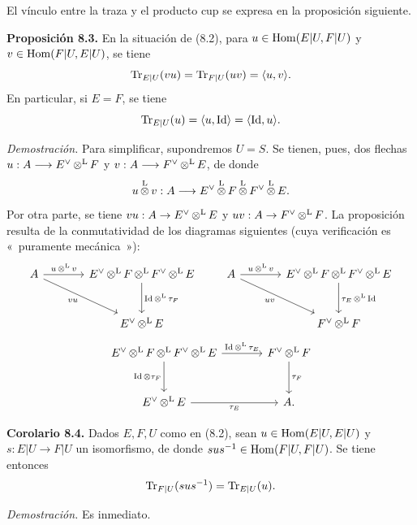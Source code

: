 El vínculo entre la traza y el producto cup se expresa en la proposición siguiente.

\textbf{Proposición 8.3.} En la situación de (8.2), para \(u\in\operatorname{Hom}(E|U,F|U)\) y \(v\in\operatorname{Hom}(F|U,E|U)\), se tiene
\[
  \operatorname{Tr}_{E|U}(vu)=\operatorname{Tr}_{F|U}(uv)=\langle u,v\rangle.
\]
En particular, si \(E=F\), se tiene
\[
  \operatorname{Tr}_{E|U}(u)=\langle u,\operatorname{Id}\rangle=\langle\operatorname{Id},u\rangle.
\]

\emph{Demostración.} Para simplificar, supondremos \(U=S\). Se tienen, pues, dos flechas \(u:A\longrightarrow E^\vee\mathop{\otimes}^{\mathrm L} F\) y \(v:A\longrightarrow F^\vee\mathop{\otimes}^{\mathrm L} E\), de donde
\[
  u\mathop{\otimes}^{\mathrm L} v:A\longrightarrow E^\vee\mathop{\otimes}^{\mathrm L} F\mathop{\otimes}^{\mathrm L} F^\vee\mathop{\otimes}^{\mathrm L} E.
\]
Por otra parte, se tiene \(vu:A\to E^\vee\mathop{\otimes}^{\mathrm L} E\) y \(uv:A\to F^\vee\mathop{\otimes}^{\mathrm L} F\). La proposición resulta de la conmutatividad de los diagramas siguientes (cuya verificación es «~puramente mecánica~»):
\[
\begin{tikzcd}[column sep=large,row sep=large]
 A \arrow[r,"u\otL v"] \arrow[dr,"vu"'] & E^\vee\otL F\otL F^\vee\otL E \arrow[d,"\Id\mathop{\otimes}^{\mathrm L}\tau_F"] \\
 & E^\vee\otL E
\end{tikzcd}
\qquad
\begin{tikzcd}[column sep=large,row sep=large]
 A \arrow[r,"u\otL v"] \arrow[dr,"uv"'] & E^\vee\otL F\otL F^\vee\otL E \arrow[d,"\tau_E\mathop{\otimes}^{\mathrm L}\Id"] \\
 & F^\vee\otL F
\end{tikzcd}
\]
\[
\begin{tikzcd}[column sep=large,row sep=large]
E^\vee\otL F\otL F^\vee\otL E \arrow[r,"\Id\mathop{\otimes}^{\mathrm L}\tau_E"] \arrow[d,"\Id\otimes\tau_F"'] & F^\vee\otL F \arrow[d,"\tau_F"]\\
E^\vee\otL E \arrow[r,"\tau_E"'] & A .
\end{tikzcd}
\]

\textbf{Corolario 8.4.} Dados \(E,F,U\) como en (8.2), sean \(u\in\operatorname{Hom}(E|U,E|U)\) y \(s:E|U\to F|U\) un isomorfismo, de donde \(sus^{-1}\in\operatorname{Hom}(F|U,F|U)\). Se tiene entonces
\[
  \operatorname{Tr}_{F|U}(sus^{-1})=\operatorname{Tr}_{E|U}(u).
\]

\emph{Demostración.} Es inmediato.
